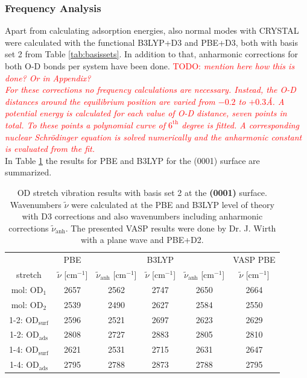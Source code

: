 \documentclass[11pt,DIV=13,BCOR=5mm,a4paper,headinclude]{scrbook}
\newcommand\todo[1]{\textcolor{red}{TODO: \textit{{#1}}}}
\begin{document}
\subsubsection{Frequency Analysis}
Apart from calculating adsorption energies, also normal modes with CRYSTAL were calculated with the functional B3LYP+D3 and PBE+D3, both with basis set 2 from Table \ref{tab:basissets}.
In addition to that, anharmonic corrections for both O-D bonds per system have been done.
\todo{mention here how this is done? Or in Appendix?\\
For these corrections no frequency calculations are necessary.
Instead, the O-D distances around the equilibrium position are varied from $-0.2$ to $+0.3$\AA{}.
A potential energy is calculated for each value of O-D distance, seven points in total.
 To these points a polynomial curve of $6^\textrm{th}$ degree is fitted.
A corresponding nuclear Schrödinger equation is solved numerically and the anharmonic constant is evaluated from the fit.}
\\
In Table \ref{tab:freqs_0001_crystal} the results for PBE and B3LYP for the (0001) surface are summarized.
\begin{table}[!h]
  \centering
  \caption{OD stretch vibration results with basis set 2 at the \textbf{(0001)} surface.
Wavenumbers $\tilde{\nu}$ were calculated at the PBE and B3LYP level of theory with D3 corrections and also wavenumbers including anharmonic corrections $\tilde{\nu}_\textrm{anh}$.
The presented VASP results were done by Dr. J. Wirth with a plane wave and PBE+D2.}
  \begin{tabular}{ccc|cc|c}
  \toprule
   & PBE & & B3LYP & &VASP PBE\\
  stretch & $\tilde{\nu}$ [cm$^{-1}$] &$\tilde{\nu}_\textrm{anh}$ [cm$^{-1}$] &$\tilde{\nu}$ [cm$^{-1}$] & $\tilde{\nu}_\textrm{anh}$ [cm$^{-1}$]& $\tilde{\nu}$ [cm$^{-1}$]\\\midrule
  mol: OD$_{\textrm{1}}$    &2657 &2562 &2747 &2650 & 2664\\
  mol: OD$_{\textrm{2}}$    &2539 &2490 &2627 &2584 & 2550\\
  1-2: OD$_{\textrm{surf}}$ &2596 &2521 &2697 &2623 & 2629\\%
  1-2: OD$_{\textrm{ads}}$  &2808 &2727 &2883 &2805 & 2810\\%
  1-4: OD$_{\textrm{surf}}$ &2621 &2531 &2715 &2631 & 2647\\%
  1-4: OD$_{\textrm{ads}}$  &2795 &2788 &2873 &2788 & 2795\\%
  \bottomrule
    \end{tabular}
  \label{tab:freqs_0001_crystal}
\end{table}
\end{document}
